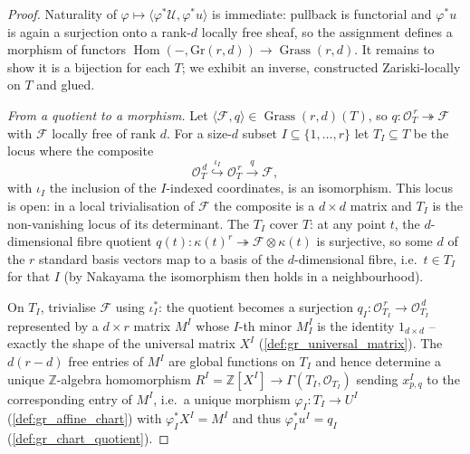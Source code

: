 \begin{proof}
  Naturality of \(\varphi \mapsto \langle \varphi^{*}\mathcal{U}, \varphi^{*}u
  \rangle\) is immediate: pullback is functorial and \(\varphi^{*}u\) is again a
  surjection onto a rank-\(d\) locally free sheaf, so the assignment defines a
  morphism of functors \(\operatorname{Hom}(-,\mathrm{Gr}(r,d)) \to
  \operatorname{Grass}(r,d)\). It remains to show it is a bijection for each
  \(T\); we exhibit an inverse, constructed Zariski-locally on \(T\) and glued.

  \emph{From a quotient to a morphism.} Let \(\langle \mathcal{F}, q \rangle \in
  \operatorname{Grass}(r,d)(T)\), so \(q : \mathcal{O}_T^{\,r} \twoheadrightarrow
  \mathcal{F}\) with \(\mathcal{F}\) locally free of rank \(d\). For a size-\(d\)
  subset \(I \subseteq \{1,\dots,r\}\) let \(T_I \subseteq T\) be the locus where
  the composite
  \[
    \mathcal{O}_T^{\,d}
      \overset{\ \iota_I\ }{\hookrightarrow} \mathcal{O}_T^{\,r}
      \xrightarrow{\ q\ } \mathcal{F},
  \]
  with \(\iota_I\) the inclusion of the \(I\)-indexed coordinates, is an
  isomorphism. This locus is open: in a local trivialisation of \(\mathcal{F}\)
  the composite is a \(d \times d\) matrix and \(T_I\) is the non-vanishing locus
  of its determinant. The \(T_I\) cover \(T\): at any point \(t\), the
  \(d\)-dimensional fibre quotient \(q(t) : \kappa(t)^{r} \twoheadrightarrow
  \mathcal{F}\otimes\kappa(t)\) is surjective, so some \(d\) of the \(r\) standard
  basis vectors map to a basis of the \(d\)-dimensional fibre, i.e.\ \(t \in T_I\)
  for that \(I\) (by Nakayama the isomorphism then holds in a neighbourhood).

  On \(T_I\), trivialise \(\mathcal{F}\) using \(\iota_I^{*}\): the quotient
  becomes a surjection \(q_I : \mathcal{O}_{T_I}^{\,r} \to \mathcal{O}_{T_I}^{\,d}\)
  represented by a \(d \times r\) matrix \(M^I\) whose \(I\)-th minor \(M^I_I\) is
  the identity \(1_{d \times d}\) -- exactly the shape of the universal matrix
  \(X^I\) (\cref{def:gr_universal_matrix}). The \(d(r-d)\) free entries of \(M^I\)
  are global functions on \(T_I\) and hence determine a unique
  \(\mathbb{Z}\)-algebra homomorphism \(R^I = \mathbb{Z}[X^I] \to
  \Gamma(T_I, \mathcal{O}_{T_I})\) sending \(x^I_{p,q}\) to the corresponding entry
  of \(M^I\), i.e.\ a unique morphism \(\varphi_I : T_I \to U^I\)
  (\cref{def:gr_affine_chart}) with \(\varphi_I^{*}X^I = M^I\) and thus
  \(\varphi_I^{*}u^I = q_I\) (\cref{def:gr_chart_quotient}).


\end{proof}
